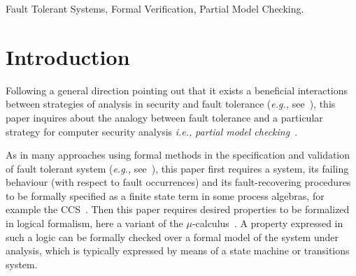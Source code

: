 \documentclass{entcs}
\newcommand{\eg}{\emph{e.g., }}
\newcommand{\ie}{\emph{i.e., }}
\begin{document}
\begin{frontmatter}
\begin{keyword}
  Fault Tolerant Systems, Formal Verification, Partial Model Checking.
\end{keyword}
\end{frontmatter}

\section{Introduction}




Following a general direction pointing out that it exists a beneficial
interactions between strategies of analysis in security and fault tolerance
(\eg see~\cite{J98:nspw,MM98:csftsa,SWD99:ssd}), this paper inquires about the
analogy between fault tolerance and a particular strategy for computer
security analysis \ie \emph{partial model
  checking}~\cite{LICS::Andersen1995,M98:csfw,fabiosos}.

As in many approaches using formal methods in the specification and validation
of fault tolerant system (\eg see~\cite{G99:acm,BFG02:stvr}), this paper first
requires a system, its failing behaviour (with respect to fault occurrences)
and its fault-recovering procedures to be formally specified as a finite state
term in some process algebras, for example the CCS~\cite{M89}. Then this paper
requires desired properties to be formalized in logical formalism, here a
variant of the $\mu$-calculus~\cite{BS01}. A property expressed in such a
logic can be formally checked over a formal model of the system under
analysis, which is typically expressed by means of a state machine or
transitions system.
\end{document}
